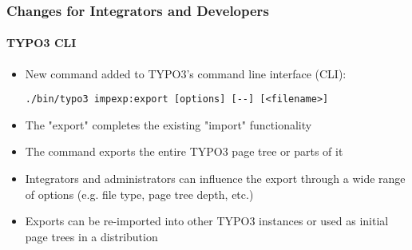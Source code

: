 %

\begin{frame}[fragile]
	\frametitle{Changes for Integrators and Developers}
	\framesubtitle{TYPO3 CLI}


	\begin{itemize}
		\item New command added to TYPO3's command line interface (CLI):
\begin{lstlisting}
./bin/typo3 impexp:export [options] [--] [<filename>]
\end{lstlisting}
		\item The "export" completes the existing "import" functionality
		\item The command exports the entire TYPO3 page tree or parts of it
		\item Integrators and administrators can influence the export through
			a wide range of options (e.g. file type, page tree depth, etc.)
		\item Exports can be re-imported into other TYPO3 instances or
			used as initial page trees in a distribution
	\end{itemize}

\end{frame}

